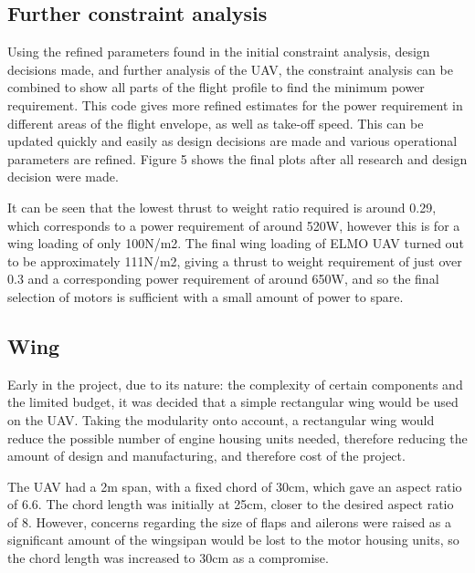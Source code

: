 \documentclass[../../main.tex]{subfiles}
\begin{document}
\subsection{Further constraint analysis} \label{sec:design-process:initial-designs:further-constraint-analysis}

Using the refined parameters found in the initial constraint analysis, design decisions made, and further analysis of the UAV, the constraint analysis can be combined to show all parts of the flight profile to find the minimum power requirement.
This code gives more refined estimates for the power requirement in different areas of the flight envelope, as well as take-off speed.
This can be updated quickly and easily as design decisions are made and various operational parameters are refined.
Figure 5 shows the final plots after all research and design decision were made.


It can be seen that the lowest thrust to weight ratio required is around 0.29, which corresponds to a power requirement of around 520W, however this is for a wing loading of only 100N/m2.
The final wing loading of ELMO UAV turned out to be approximately 111N/m2, giving a thrust to weight requirement of just over 0.3 and a corresponding power requirement of around 650W, and so the final selection of motors is sufficient with a small amount of power to spare. 

\subsection{Wing} \label{sec:design-process:initial-designs:wing}

Early in the project, due to its nature: the complexity of certain components and the limited budget, it was decided that a simple rectangular wing would be used on the UAV.
Taking the modularity onto account, a rectangular wing would reduce the possible number of engine housing units needed, therefore reducing the amount of design and manufacturing, and therefore cost of the project. 

The UAV had a 2m span, with a fixed chord of 30cm, which gave an aspect ratio of 6.6.
The chord length was initially at 25cm, closer to the desired aspect ratio of 8.
However, concerns regarding the size of flaps and ailerons were raised as a significant amount of the wingsipan would be lost to the motor housing units, so the chord length was increased to 30cm as a compromise.  
\end{document}
